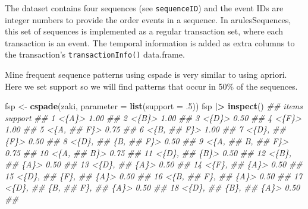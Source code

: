 \documentclass[
  notitlepage]{book}
\newenvironment{Shaded}{\begin{snugshade}}{\end{snugshade}}
\newcommand{\CommentTok}[1]{\textcolor[rgb]{0.56,0.35,0.01}{\textit{#1}}}
\newcommand{\DataTypeTok}[1]{\textcolor[rgb]{0.13,0.29,0.53}{#1}}
\newcommand{\ErrorTok}[1]{\textcolor[rgb]{0.64,0.00,0.00}{\textbf{#1}}}
\newcommand{\FloatTok}[1]{\textcolor[rgb]{0.00,0.00,0.81}{#1}}
\newcommand{\KeywordTok}[1]{\textcolor[rgb]{0.13,0.29,0.53}{\textbf{#1}}}
\newcommand{\NormalTok}[1]{#1}
\newcommand{\OperatorTok}[1]{\textcolor[rgb]{0.81,0.36,0.00}{\textbf{#1}}}
\newcommand{\StringTok}[1]{\textcolor[rgb]{0.31,0.60,0.02}{#1}}
\begin{document}
The dataset contains four sequences (see \texttt{sequenceID}) and the event IDs
are integer numbers to provide the order events in a sequence.
In arulesSequences, this set of sequences is implemented as a regular transaction
set, where each transaction is an event. The temporal information is added
as extra columns to the transaction's \texttt{transactionInfo()} data.frame.

Mine frequent sequence patterns
using cspade is very similar to using apriori.
Here we set support so we will find patterns that occur in 50\% of the
sequences.

\begin{Shaded}
\begin{Highlighting}[]
\NormalTok{fsp \textless{}{-}}\StringTok{ }\KeywordTok{cspade}\NormalTok{(zaki, }\DataTypeTok{parameter =} \KeywordTok{list}\NormalTok{(}\DataTypeTok{support =} \FloatTok{.5}\NormalTok{))}
\NormalTok{fsp }\OperatorTok{|}\ErrorTok{\textgreater{}}\StringTok{ }\KeywordTok{inspect}\NormalTok{()}
\CommentTok{\#\#     items support }
\CommentTok{\#\#   1 \textless{}\{A\}\textgreater{}    1.00 }
\CommentTok{\#\#   2 \textless{}\{B\}\textgreater{}    1.00 }
\CommentTok{\#\#   3 \textless{}\{D\}\textgreater{}    0.50 }
\CommentTok{\#\#   4 \textless{}\{F\}\textgreater{}    1.00 }
\CommentTok{\#\#   5 \textless{}\{A,   }
\CommentTok{\#\#       F\}\textgreater{}    0.75 }
\CommentTok{\#\#   6 \textless{}\{B,   }
\CommentTok{\#\#       F\}\textgreater{}    1.00 }
\CommentTok{\#\#   7 \textless{}\{D\},  }
\CommentTok{\#\#      \{F\}\textgreater{}    0.50 }
\CommentTok{\#\#   8 \textless{}\{D\},  }
\CommentTok{\#\#      \{B,   }
\CommentTok{\#\#       F\}\textgreater{}    0.50 }
\CommentTok{\#\#   9 \textless{}\{A,   }
\CommentTok{\#\#       B,   }
\CommentTok{\#\#       F\}\textgreater{}    0.75 }
\CommentTok{\#\#  10 \textless{}\{A,   }
\CommentTok{\#\#       B\}\textgreater{}    0.75 }
\CommentTok{\#\#  11 \textless{}\{D\},  }
\CommentTok{\#\#      \{B\}\textgreater{}    0.50 }
\CommentTok{\#\#  12 \textless{}\{B\},  }
\CommentTok{\#\#      \{A\}\textgreater{}    0.50 }
\CommentTok{\#\#  13 \textless{}\{D\},  }
\CommentTok{\#\#      \{A\}\textgreater{}    0.50 }
\CommentTok{\#\#  14 \textless{}\{F\},  }
\CommentTok{\#\#      \{A\}\textgreater{}    0.50 }
\CommentTok{\#\#  15 \textless{}\{D\},  }
\CommentTok{\#\#      \{F\},  }
\CommentTok{\#\#      \{A\}\textgreater{}    0.50 }
\CommentTok{\#\#  16 \textless{}\{B,   }
\CommentTok{\#\#       F\},  }
\CommentTok{\#\#      \{A\}\textgreater{}    0.50 }
\CommentTok{\#\#  17 \textless{}\{D\},  }
\CommentTok{\#\#      \{B,   }
\CommentTok{\#\#       F\},  }
\CommentTok{\#\#      \{A\}\textgreater{}    0.50 }
\CommentTok{\#\#  18 \textless{}\{D\},  }
\CommentTok{\#\#      \{B\},  }
\CommentTok{\#\#      \{A\}\textgreater{}    0.50 }
\CommentTok{\#\# }
\end{Highlighting}
\end{Shaded}
\end{document}
